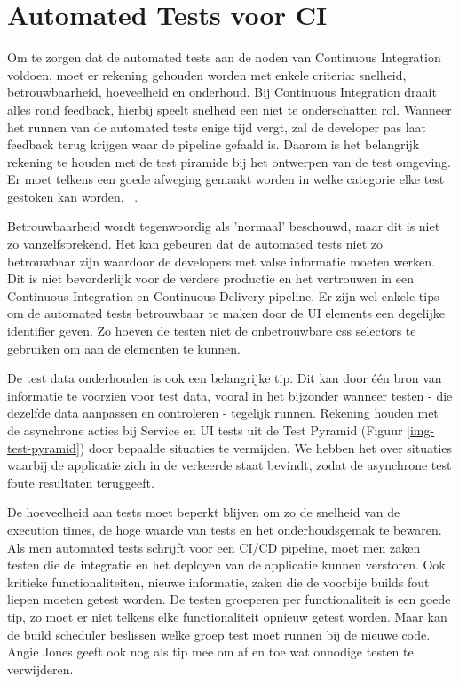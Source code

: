 \section{Automated Tests voor CI}
\label{sec:automated-test-voor-ci}
Om te zorgen dat de automated tests aan de noden van Continuous Integration voldoen, moet er rekening gehouden worden met enkele criteria: snelheid, betrouwbaarheid, hoeveelheid en onderhoud.
Bij Continuous Integration draait alles rond feedback, hierbij speelt snelheid een niet te onderschatten rol. Wanneer het runnen van de automated tests enige tijd vergt, zal de developer pas laat feedback terug krijgen waar de pipeline gefaald is. Daarom is het belangrijk rekening te houden met de test piramide bij het ontwerpen van de test omgeving. Er moet telkens een goede afweging gemaakt worden in welke categorie elke test gestoken kan worden.
~\autocite{Jones2019}.

Betrouwbaarheid wordt tegenwoordig als 'normaal' beschouwd, maar dit is niet zo vanzelfsprekend. Het kan gebeuren dat de automated tests niet zo betrouwbaar zijn waardoor de developers met valse informatie moeten werken. Dit is niet bevorderlijk voor de verdere productie en het vertrouwen in een Continuous Integration en Continuous Delivery pipeline. Er zijn wel enkele tips om de automated tests betrouwbaar te maken door de UI elements een degelijke identifier geven. Zo hoeven de testen niet de onbetrouwbare css selectors te gebruiken om aan de elementen te kunnen. 

De test data onderhouden is ook een belangrijke tip. Dit kan door één bron van informatie te voorzien voor test data, vooral in het bijzonder wanneer testen - die dezelfde data aanpassen en controleren - tegelijk runnen. Rekening houden met de asynchrone acties bij Service en UI tests uit de Test Pyramid (Figuur \ref{img-test-pyramid}) door bepaalde situaties te vermijden. We hebben het over situaties waarbij de applicatie zich in de verkeerde staat bevindt, zodat de asynchrone test foute resultaten teruggeeft.

De hoeveelheid aan tests moet beperkt blijven om zo de snelheid van de execution times, de hoge waarde van tests en het onderhoudsgemak te bewaren.
Als men automated tests schrijft voor een CI/CD pipeline, moet men zaken testen die de integratie en het deployen van de applicatie kunnen verstoren.
Ook kritieke functionaliteiten, nieuwe informatie, zaken die de voorbije builds fout liepen moeten getest worden. 
De testen groeperen per functionaliteit is een goede tip, zo moet er niet telkens elke functionaliteit opnieuw getest worden. Maar kan de build scheduler beslissen welke groep test moet runnen bij de nieuwe code. 
Angie Jones \textcite{Jones2019} geeft ook nog als tip mee om af en toe wat onnodige testen te verwijderen.

